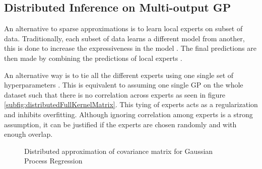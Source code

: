 \subsection{Distributed Inference on Multi-output GP}\label{sec:dMOGP}
An alternative to sparse approximations is to learn local experts on subset of data. Traditionally, each subset of data learns a different model from another, this is done to increase the expressiveness in the model \cite{rasmussen2002infinite}. The final predictions are then made by combining the predictions of local experts \cite{chen2009bagging}. 

An alternative way is to tie all the different experts using one single set of hyperparameters \cite{deisenroth2015distributed}. This is equivalent to assuming one single GP on the whole dataset such that there is no correlation across experts as seen in figure \ref{subfig:distributedFullKernelMatrix}. This tying of experts acts as a regularization and inhibits overfitting. Although ignoring correlation among experts is a strong assumption, it can be justified if the experts are chosen randomly and with enough overlap. 

\begin{figure}[!t]
  \centering
  \quad
  \caption{Distributed approximation of covariance matrix for Gaussian Process Regression}
\end{figure}

